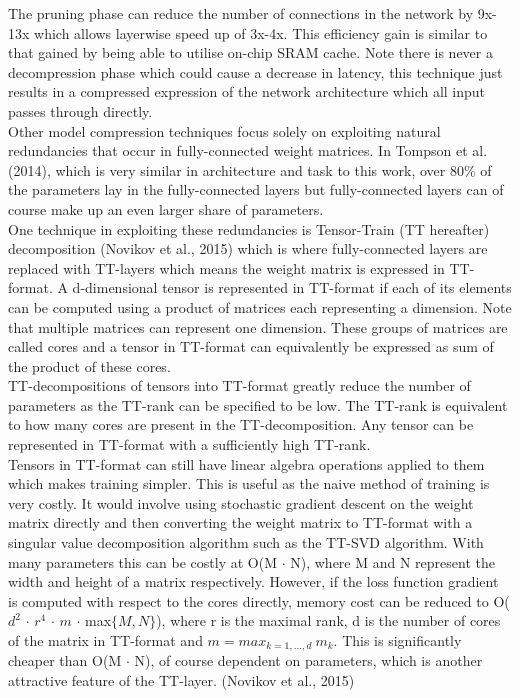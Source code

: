\documentclass{article}
\begin{document}
The pruning phase can reduce the number of connections in the network by 9x-13x which allows layerwise speed up of 3x-4x. This efficiency gain is similar to that gained by being able to utilise on-chip SRAM cache. Note there is never a decompression phase which could cause a decrease in latency, this technique just results in a compressed expression of the network architecture which all input passes through directly.\\

Other model compression techniques focus solely on exploiting natural redundancies that occur in fully-connected weight matrices. In Tompson et al. (2014), which is very similar in architecture and task to this work, over 80\% of the parameters lay in the fully-connected layers but fully-connected layers can of course make up an even larger share of parameters.\\

One technique in exploiting these redundancies is Tensor-Train (TT hereafter) decomposition (Novikov et al., 2015) which is where fully-connected layers are replaced with TT-layers which means the weight matrix is expressed in TT-format. A d-dimensional tensor is represented in TT-format if each of its elements can be computed using a product of matrices each representing a dimension. Note that multiple matrices can represent one dimension. These groups of matrices are called cores and a tensor in TT-format can equivalently be expressed as sum of the product of these cores. \\

TT-decompositions of tensors into TT-format greatly reduce the number of parameters as the TT-rank can be specified to be low. The TT-rank is equivalent to how many cores are present in the TT-decomposition. Any tensor can be represented in TT-format with a sufficiently high TT-rank.\\

Tensors in TT-format can still have linear algebra operations applied to them which makes training simpler. This is useful as the naive method of training is very costly. It would involve using stochastic gradient descent on the weight matrix directly and then converting the weight matrix to TT-format with a singular value decomposition algorithm such as the TT-SVD algorithm. With many parameters this can be costly at O(M $\cdot$ N), where M and N represent the width and height of a matrix respectively. However, if the loss function gradient is computed with respect to the cores directly, memory cost can be reduced to O($d^2$ $\cdot$ $r^4$ $\cdot$ $m$ $\cdot$ max$\{M, N\}$), where r is the maximal rank, d is the number of cores of the matrix in TT-format and $m = max_{k=1,...,d} \ m_k$. This is significantly cheaper than O(M $\cdot$ N), of course dependent on parameters, which is another attractive feature of the TT-layer. (Novikov et al., 2015)\\
\end{document}
